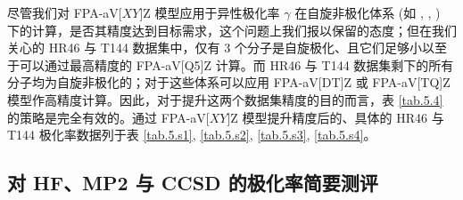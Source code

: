 \begin{table}[!ht]
\centering
\caption[HR46 与 T144 子集下 $\symup{\Delta} \tilde \gamma_\textsf{CCSD(T)}$ 在不同 FPA 模型下 RelRMSD]{HR46 与 T144 子集下异性极化率 $\symup{\Delta} \tilde \gamma_\textsf{CCSD(T)}$ 在不同 FPA 模型下的相对方均根误差\textrm{\textsuperscript{\emph{a}}}。}
\label{tab.5.6}
\end{table}

尽管我们对 FPA-aV[$XY$]Z 模型应用于异性极化率 $\gamma$ 在自旋非极化体系 (如 , , ) 下的计算，是否其精度达到目标需求，这个问题上我们报以保留的态度；但在我们关心的 HR46 与 T144 数据集中，仅有 3 个分子是自旋极化、且它们足够小以至于可以通过最高精度的 FPA-aV[Q5]Z 计算。而 HR46 与 T144 数据集剩下的所有分子均为自旋非极化的；对于这些体系可以应用 FPA-aV[DT]Z 或 FPA-aV[TQ]Z 模型作高精度计算。因此，对于提升这两个数据集精度的目的而言，表 \ref{tab.5.4} 的策略是完全有效的。通过 FPA-aV[$XY$]Z 模型提升精度后的、具体的 HR46 与 T144 极化率数据列于表 \ref{tab.5.s1}, \ref{tab.5.s2}, \ref{tab.5.s3}, \ref{tab.5.s4}。

\subsection{对 HF、MP2 与 CCSD 的极化率简要测评}
\label{sec.5.bench-wft-polar}

